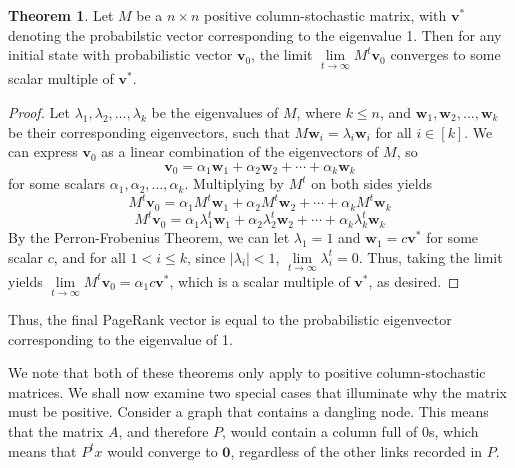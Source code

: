 \documentclass[11pt]{article}
\theoremstyle{definition}
\newtheorem{theorem}{Theorem}
\newcommand{\abs}[1]{\left| #1\right|}
\renewcommand{\vec}[1]{\mathbf{#1}}
\begin{document}

\begin{theorem}
    Let $M$ be a $n\times n$ positive column-stochastic matrix, with $\vec{v}^*$ denoting the probabilstic vector corresponding to the eigenvalue 1.
    Then for any initial state with probabilistic vector $\vec{v}_0$, the limit $\lim\limits_{t\to \infty}{M^t \vec{v}_0}$ converges to some scalar multiple of $\vec{v}^*$.    
\end{theorem}
\begin{proof}
    Let $\lambda_1, \lambda_2, \ldots, \lambda_k$ be the eigenvalues of $M$, where $k \leq n$, and $\vec{w}_1, \vec{w}_2, \ldots, \vec{w}_k$ be their corresponding eigenvectors, 
    such that $M \vec{w}_i = \lambda_i \vec{w}_i$ for all $i \in [k]$.
    We can express $\vec{v}_0$ as a linear combination of the eigenvectors of $M$, so
    $$\vec{v}_0 = \alpha_1 \vec{w}_1 + \alpha_2 \vec{w}_2 + \cdots + \alpha_k \vec{w}_k$$
    for some scalars $\alpha_1, \alpha_2, \ldots, \alpha_k$. Multiplying by $M^t$ on both sides yields
    $$M^t \vec{v}_0 = \alpha_1 M^t \vec{w}_1 + \alpha_2 M^t \vec{w}_2 + \cdots + \alpha_k M^t \vec{w}_k$$
    $$M^t \vec{v}_0 = \alpha_1 \lambda_1^t \vec{w}_1 + \alpha_2 \lambda_2^t \vec{w}_2 + \cdots + \alpha_k \lambda_k^t \vec{w}_k$$
    By the Perron-Frobenius Theorem, we can let $\lambda_1 = 1$ and $\vec{w}_1 = c \vec{v}^*$ for some scalar $c$,
    and for all $1 < i \leq k$, since $\abs{\lambda_i} < 1$, $\lim\limits_{t\to \infty}{\lambda_i^t} = 0$.
    Thus, taking the limit yields $\lim\limits_{t\to \infty}{M^t \vec{v}_0} = \alpha_1 c \vec{v}^*$, which is a scalar multiple of $\vec{v}^*$, as desired.
\end{proof}

Thus, the final PageRank vector is equal to the probabilistic eigenvector corresponding to the eigenvalue of 1.

We note that both of these theorems only apply to positive column-stochastic matrices.
We shall now examine two special cases that illuminate why the matrix must be positive.
Consider a graph that contains a dangling node. This means that the matrix $A$, and therefore $P$, would contain a column full of 0s, which means that $P^tx$ would converge to $\vec{0}$, regardless of the other links recorded in $P$.
\end{document}

